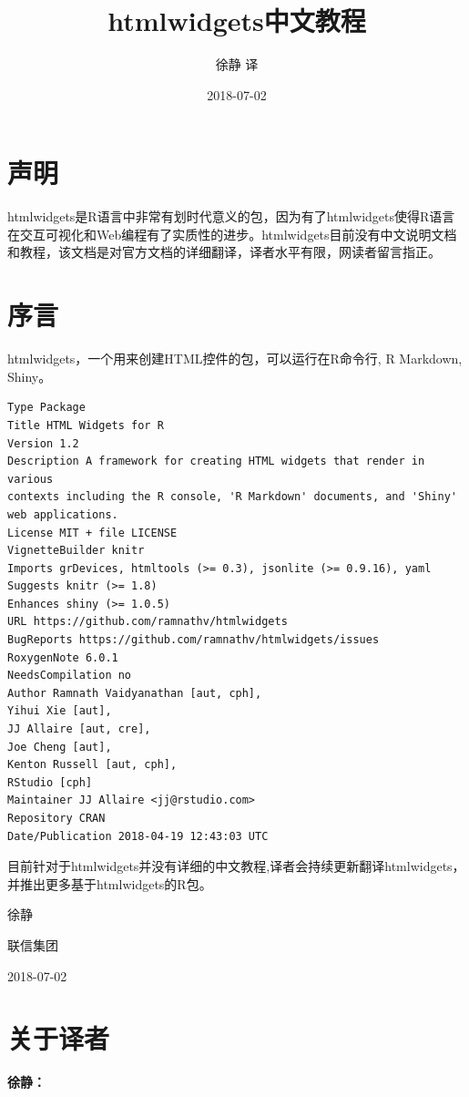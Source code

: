 \documentclass[]{book}
\title{htmlwidgets中文教程}
\author{徐静 译}
\date{2018-07-02}
\theoremstyle{definition}
\theoremstyle{definition}
\theoremstyle{definition}
\theoremstyle{remark}
\begin{document}
\maketitle

{
\setcounter{tocdepth}{1}
\tableofcontents
}
\chapter*{声明}

htmlwidgets是R语言中非常有划时代意义的包，因为有了htmlwidgets使得R语言在交互可视化和Web编程有了实质性的进步。htmlwidgets目前没有中文说明文档和教程，该文档是对官方文档的详细翻译，译者水平有限，网读者留言指正。

\chapter*{序言}

htmlwidgets，一个用来创建HTML控件的包，可以运行在R命令行, R Markdown,
Shiny。

\begin{verbatim}
Type Package
Title HTML Widgets for R
Version 1.2
Description A framework for creating HTML widgets that render in various
contexts including the R console, 'R Markdown' documents, and 'Shiny'
web applications.
License MIT + file LICENSE
VignetteBuilder knitr
Imports grDevices, htmltools (>= 0.3), jsonlite (>= 0.9.16), yaml
Suggests knitr (>= 1.8)
Enhances shiny (>= 1.0.5)
URL https://github.com/ramnathv/htmlwidgets
BugReports https://github.com/ramnathv/htmlwidgets/issues
RoxygenNote 6.0.1
NeedsCompilation no
Author Ramnath Vaidyanathan [aut, cph],
Yihui Xie [aut],
JJ Allaire [aut, cre],
Joe Cheng [aut],
Kenton Russell [aut, cph],
RStudio [cph]
Maintainer JJ Allaire <jj@rstudio.com>
Repository CRAN
Date/Publication 2018-04-19 12:43:03 UTC
\end{verbatim}

目前针对于htmlwidgets并没有详细的中文教程,译者会持续更新翻译htmlwidgets，并推出更多基于htmlwidgets的R包。

徐静

联信集团

2018-07-02

\chapter*{关于译者}

\textbf{徐静：}
\end{document}
